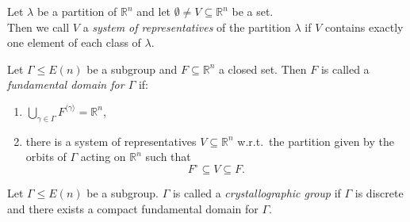 \documentclass{beamer}
\theoremstyle{plain}
\newcommand\R{\mathbb R}
\begin{document}
\begin{frame}
    \begin{definition}\label{def:system-of-reps}
        Let $\lambda$ be a partition of $\R^n$ and let $\emptyset \neq V \subseteq \R^n$ be a set.\\ \pause
        Then we call $V$ a \emph{system of representatives} of the partition $\lambda$ if $V$ contains exactly one element of each class of $\lambda$.
    \end{definition} \pause

    \begin{definition}\label{def:fund-dom}
        Let $\Gamma \leq E(n)$ be a subgroup and $F \subseteq \R^n$ a closed set.
        Then $F$ is called a \emph{fundamental domain for $\Gamma$} if:\pause
        \begin{enumerate}[label=(\roman*)]
            \item $\bigcup_{\gamma \in \Gamma} F^{\langle \gamma \rangle} = \R^n$, \pause
            \item there is a system of representatives $V \subseteq \R^n$ w.r.t.\ the partition given by the orbits of $\Gamma$ acting on $\R^n$ such that $$F^\circ \subseteq V \subseteq F.$$
        \end{enumerate}
    \end{definition}
\end{frame}

\begin{frame}
    \begin{definition}
        Let $\Gamma \leq E(n)$ be a subgroup.
        $\Gamma$ is called a \emph{crystallographic group} if $\Gamma$ is discrete and there exists a compact fundamental domain for $\Gamma$.\\
    \end{definition}
\end{frame}
\end{document}
